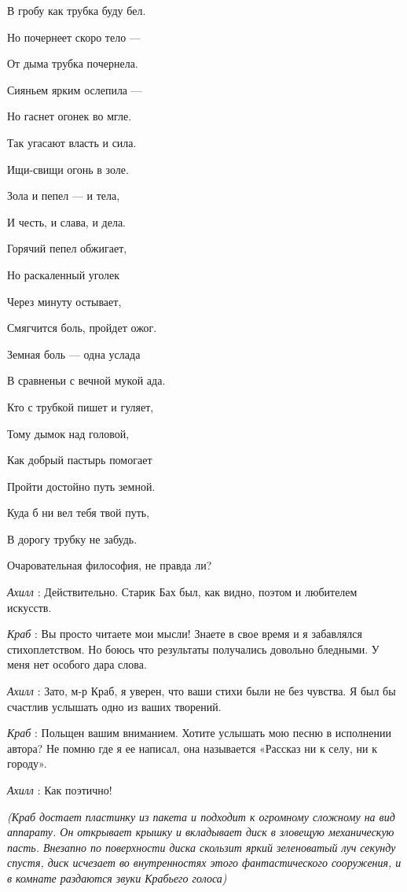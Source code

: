 \documentclass[../main.tex]{subfiles}
\begin{document}
\begin{dialogue}
В гробу как трубка буду бел.

Но почернеет скоро тело ---

От дыма трубка почернела.

Сияньем ярким ослепила ---

Но гаснет огонек во мгле.

Так угасают власть и сила.

Ищи-свищи огонь в золе.

Зола и пепел --- и тела,

И честь, и слава, и дела.

Горячий пепел обжигает,

Но раскаленный уголек

Через минуту остывает,

Смягчится боль, пройдет ожог.

Земная боль --- одна услада

В сравненьи с вечной мукой ада.

Кто с трубкой пишет и гуляет,

Тому дымок над головой,

Как добрый пастырь помогает

Пройти достойно путь земной.

Куда б ни вел тебя твой путь,

В дорогу трубку не забудь.

Очаровательная философия, не правда ли?

\emph{Ахилл} : Действительно. Старик Бах был, как видно, поэтом и любителем искусств.

\emph{Краб} : Вы просто читаете мои мысли! Знаете в свое время и я забавлялся стихоплетством. Но боюсь что результаты получались довольно бледными. У меня нет особого дара слова.

\emph{Ахилл} : Зато, м-р Краб, я уверен, что ваши стихи были не без чувства. Я был бы счастлив услышать одно из ваших творений.

\emph{Краб} : Польщен вашим вниманием. Хотите услышать мою песню в исполнении автора? Не помню где я ее написал, она называется «Рассказ ни к селу, ни к городу».

\emph{Ахилл} : Как поэтично!

\emph{(Краб достает пластинку из пакета и подходит к огромному сложному на вид аппарату. Он открывает крышку и вкладывает диск в зловещую механическую пасть. Внезапно по поверхности диска скользит яркий зеленоватый луч секунду спустя, диск исчезает во внутренностях этого фантастического сооружения, и в комнате раздаются звуки Крабьего голоса)}


\end{dialogue}
\end{document}
